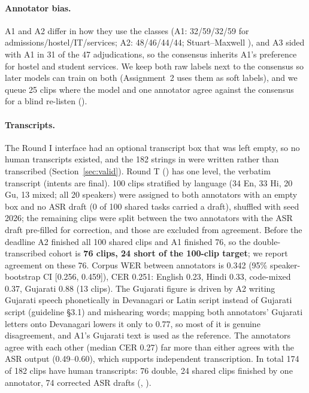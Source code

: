 \documentclass[sigconf,authordraft]{acmart}
\begin{document}
\paragraph{Annotator bias.}
A1 and A2 differ in how they use the classes (A1: 32/59/32/59 for admissions/hostel/IT/services; A2: 48/46/44/44; Stuart--Maxwell \AnnSM{}), and A3 sided with A1 in 31 of the 47 adjudications, so the consensus inherits A1's preference for hostel and student services. We keep both raw labels next to the consensus so later models can train on both (Assignment~2 uses them as soft labels), and we queue 25 clips where the model and one annotator agree against the consensus for a blind re-listen ().
\paragraph{Transcripts.}
The Round I interface had an optional transcript box that was left empty, so no human transcripts existed, and the 182 strings in  were written rather than transcribed (Section~\ref{sec:valid}). Round T () has one level, the verbatim transcript (intents are final). 100 clips stratified by language (34 En, 33 Hi, 20 Gu, 13 mixed; all 20 speakers) were assigned to both annotators with an empty box and no ASR draft (0 of 100 shared tasks carried a draft), shuffled with seed 2026; the remaining clips were split between the two annotators with the ASR draft pre-filled for correction, and those are excluded from agreement. Before the deadline A2 finished all 100 shared clips and A1 finished 76, so the double-transcribed cohort is \textbf{76 clips, 24 short of the 100-clip target}; we report agreement on these 76. Corpus WER between annotators is 0.342 (95\% speaker-bootstrap CI [0.256, 0.459]), CER 0.251: English 0.23, Hindi 0.33, code-mixed 0.37, Gujarati 0.88 (13 clips). The Gujarati figure is driven by A2 writing Gujarati speech phonetically in Devanagari or Latin script instead of Gujarati script (guideline \S3.1) and mishearing words; mapping both annotators' Gujarati letters onto Devanagari lowers it only to 0.77, so most of it is genuine disagreement, and A1's Gujarati text is used as the reference. The annotators agree with each other (median CER 0.27) far more than either agrees with the ASR output (0.49--0.60), which supports independent transcription. In total 174 of 182 clips have human transcripts: 76 double, 24 shared clips finished by one annotator, 74 corrected ASR drafts (, ).
\end{document}
